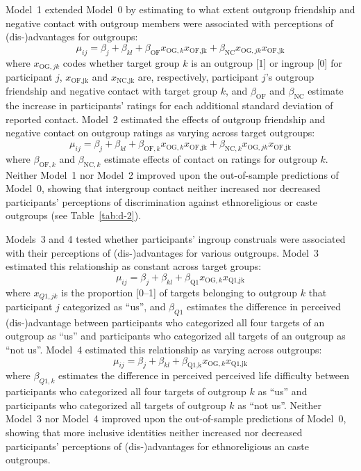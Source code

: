 \documentclass[12pt, a4paper]{article}
\begin{document}
Model~1 extended Model~0 by estimating to what extent outgroup friendship and negative contact with outgroup members were associated with perceptions of (dis-)advantages for outgroups: $$ \mu_{ij} = \beta_{j} + \beta_{kl} + \beta_\text{OF}x_{\text{OG},k}x_\text{OF,jk} + \beta_\text{NC}x_{\text{OG},jk}x_\text{OF,jk}$$ where $x_{\text{OG},jk}$ codes whether target group $k$ is an outgroup [1] or ingroup [0] for participant $j$, $x_\text{OF,jk}$ and $x_\text{NC,jk}$ are, respectively, participant $j$'s outgroup friendship and negative contact with target group $k$, and $\beta_\text{OF}$ and $\beta_\text{NC}$ estimate the increase in participants' ratings for each additional standard deviation of reported contact. Model~2 estimated the effects of outgroup friendship and negative contact on outgroup ratings as varying across target outgroups: $$ \mu_{ij} = \beta_{j} + \beta_{kl} + \beta_{\text{OF},k}x_{\text{OG},k}x_\text{OF,jk} + \beta_{\text{NC},k}x_{\text{OG},jk}x_\text{OF,jk}$$ where $\beta_{\text{OF},k}$ and $\beta_{\text{NC},k}$ estimate effects of contact on ratings for outgroup $k$. Neither Model~1 nor Model~2 improved upon the out-of-sample predictions of Model~0, showing that intergroup contact neither increased nor decreased participants' perceptions of discrimination against ethnoreligious or caste outgroups (see Table~\ref{tab:d-2}).

Models~3 and 4 tested whether participants' ingroup construals were associated with their perceptions of (dis-)advantages for various outgroups. Model~3 estimated this relationship as constant across target groups: $$ \mu_{ij} = \beta_{j} + \beta_{kl} + \beta_\text{Q1}x_{\text{OG},k}x_\text{Q1,jk} $$ where $x_{Q1,jk}$ is the proportion [0--1] of targets belonging to outgroup $k$ that participant $j$ categorized as ``us'', and $\beta_{Q1}$ estimates the difference in perceived (dis-)advantage between participants who categorized all four targets of an outgroup as ``us'' and participants who categorized all targets of an outgroup as ``not us''. Model~4 estimated this relationship as varying across outgroups: $$ \mu_{ij} = \beta_{j} + \beta_{kl} + \beta_\text{Q1,k}x_{\text{OG},k}x_\text{Q1,jk} $$ where $\beta_{Q1,k}$ estimates the difference in perceived perceived life difficulty between participants who categorized all four targets of outgroup $k$ as ``us'' and participants who categorized all targets of outgroup $k$ as ``not us''. Neither Model~3 nor Model~4 improved upon the out-of-sample predictions of Model~0, showing that more inclusive identities neither increased nor decreased participants' perceptions of (dis-)advantages for ethnoreligious an caste outgroups. %
\end{document}
